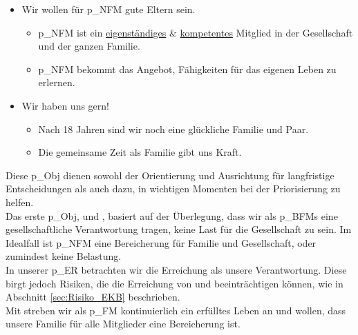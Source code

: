 \begin{itemize}
	\item Wir wollen für \gls{p_NFM} gute Eltern sein.
	\begin{itemize}
	\item \gls{p_NFM} ist ein \underline{eigenständiges} $\&$ \underline{kompetentes} Mitglied in der Gesellschaft und der ganzen Familie. \label{NFM_O_1}
	\item \gls{p_NFM} bekommt das Angebot, Fähigkeiten für das eigenen Leben zu erlernen. \label{NFM_O_2}
	\end{itemize}
	\item Wir haben uns gern!
	\begin{itemize}
	\item Nach 18 Jahren sind wir noch eine glückliche Familie und Paar.\label{NFM_O_4}
 	\item Die gemeinsame Zeit als Familie gibt uns Kraft. \label{NFM_O_3}
	\end{itemize}
\end{itemize}


Diese \gls{p_Obj} dienen sowohl der Orientierung und Ausrichtung für langfristige Entscheidungen als auch dazu, in wichtigen Momenten bei der Priorisierung zu helfen.\\


Das erste \gls{p_Obj}, \NFMOOne und \NFMOTwo, basiert auf der Überlegung, dass wir als \glspl{p_BFM} eine gesellschaftliche Verantwortung tragen, keine Last für die Gesellschaft zu sein. Im Idealfall ist \gls{p_NFM} eine Bereicherung für Familie und Gesellschaft, oder zumindest keine Belastung.\\


In unserer \gls{p_ER} betrachten wir die Erreichung als unsere Verantwortung. Diese birgt jedoch Risiken, die die Erreichung von \NFMOTwo und \NFMOThree beeinträchtigen können, wie in Abschnitt \ref{sec:Risiko_EKB} beschrieben.\\


Mit \NFMOFour streben wir als \gls{p_FM} kontinuierlich ein erfülltes Leben an und wollen, dass unsere Familie für alle Mitglieder eine Bereicherung ist.\\


